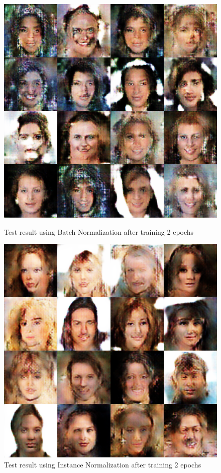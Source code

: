 \begin{figure}
    \begin{minipage}[t]{0.48\linewidth}
        \centering
        \includegraphics[width=\textwidth]{figures/result_norm_batch.png}
        \caption{Test result using Batch Normalization after training 2 epochs}
        \label{norm_bach}
    \end{minipage}
        \hfill
    \begin{minipage}[t]{0.48\linewidth}
        \centering
        \includegraphics[width=\textwidth]{figures/result_norm_instance.png}
        \caption{Test result using Instance Normalization after training 2 epochs}
        \label{norm_instance}
    \end{minipage}
\end{figure}

